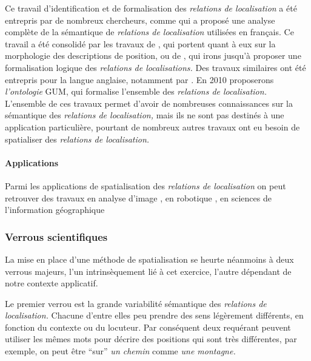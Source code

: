 Ce travail d'identification et de formalisation des \emph{relations de
  localisation} a été entrepris par de nombreux chercheurs, comme
\textcite{Vandeloise1986} qui a proposé une analyse complète de la
sémantique de \emph{relations de localisation} utilisées en
français. Ce travail a été consolidé par les travaux de
\textcite{Borillo1998}, qui portent quant à eux sur la morphologie des
descriptions de position, ou de \textcite{Aurnague1993, Aurnague1997},
qui irons jusqu'à proposer une formalisation logique des
\emph{relations de localisations.} Des travaux similaires ont été
entrepris pour la langue anglaise, notamment par
\autocite{Kracht2002,Mark1999,Freksa2018,Carlson2005,Lang1991,Matsakis2010}.
En 2010 \textcite{Bateman2010} proposerons \emph{l'ontologie} GUM, qui
formalise l'ensemble des \emph{relations de localisation.} L'ensemble
de ces travaux permet d'avoir de nombreuses connaissances sur la
sémantique des \emph{relations de localisation,} mais ils ne sont pas
destinés à une application particulière, pourtant de nombreux autres
travaux ont eu besoin de spatialiser des \emph{relations de
  localisation.}

\paragraph{Applications}

Parmi les applications de spatialisation des \emph{relations de
  localisation} on peut retrouver des travaux en analyse d'image
\autocite{Hudelot2008, Hudelot2008a,Bloch1996, Vanegas2011,
  Takemura2012}, en robotique \autocite{Skubic2004}, en sciences de
l'information géographique
\autocite{Xu2007a,Xu2007,Xu2006,Wolter2018,Dittrich2015,Du2016,Hornsby2009,Mathet2000,Hall2015}



\subsubsection{Verrous scientifiques}

La mise en place d'une méthode de spatialisation se heurte néanmoins à
deux verrous majeurs, l'un intrinsèquement lié à cet exercice, l'autre
dépendant de notre contexte applicatif.

Le premier verrou est la grande variabilité sémantique des
\emph{relations de localisation.} Chacune d'entre elles peu prendre
des sens légèrement différents, en fonction du contexte ou du
locuteur. Par conséquent deux requérant peuvent utiliser les mêmes
mots pour décrire des positions qui sont très différentes, par
exemple, on peut être \enquote{sur} \emph{un chemin} comme \emph{une
  montagne.}

